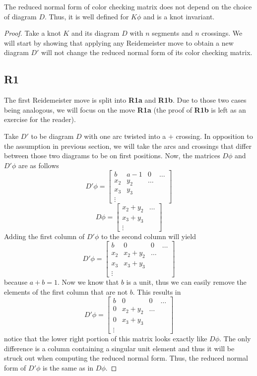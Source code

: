 \begin{theorem}
  The reduced normal form of color checking matrix does not depend on the choice of diagram $D$. Thus, it is well defined for $K\phi$ and is a knot invariant.
\end{theorem}

\begin{proof}
Take a knot $K$ and its diagram $D$ with $n$ segments and $n$ crossings. We will start by showing that applying any Reidemeister move to obtain a new diagram $D'$ will not change the reduced normal form of its color checking matrix.

  \subsection*{\centering R1}

  The first Reidemeister move is split into \textbf{R1a} and \textbf{R1b}. Due to those two cases being analogous, we will focus on the move \textbf{R1a} (the proof of \textbf{R1b} is left as an exercise for the reader).

  Take $D'$ to be diagram $D$ with one arc twisted into a $+$ crossing. In opposition to the assumption in previous section, we will take the arcs and crossings that differ between those two diagrams to be on first positions. Now, the matrices $D\phi$ and $D'\phi$ are as follows
  $$
  D'\phi=
  \begin{bmatrix}
    b & a-1 & 0 & \hdots\\ 
    x_2 & y_2 & \hdots \\ 
    x_3 & y_3 \\ 
    \vdots 
  \end{bmatrix}
  $$
  $$
  D\phi=
  \begin{bmatrix}
    x_2 + y_2 & \hdots \\ 
    x_3 + y_3 \\ 
    \vdots
  \end{bmatrix}
  $$
  Adding the first column of $D'\phi$ to the second column will yield 
  $$
  D'\phi=
  \begin{bmatrix}
    b & 0 & 0 & \hdots\\ 
    x_2 & x_2+y_2 & \hdots \\ 
    x_3 & x_3+y_3 \\ 
    \vdots 
  \end{bmatrix}
  $$
  because $a+b=1$. Now we know that $b$ is a unit, thus we can easily remove the elements of the first column that are not $b$. This results in 
  $$
  D'\phi=
  \begin{bmatrix}
    b & 0 & 0 & \hdots\\ 
    0 & x_2+y_2 & \hdots \\ 
    0 & x_3+y_3 \\ 
    \vdots 
  \end{bmatrix}
  $$
  notice that the lower right portion of this matrix looks exactly like $D\phi$. The only difference is a column containing a singular unit element and thus it will be struck out when computing the reduced normal form. Thus, the reduced normal form of $D'\phi$ is the same as in $D\phi$.
  

\end{proof}

